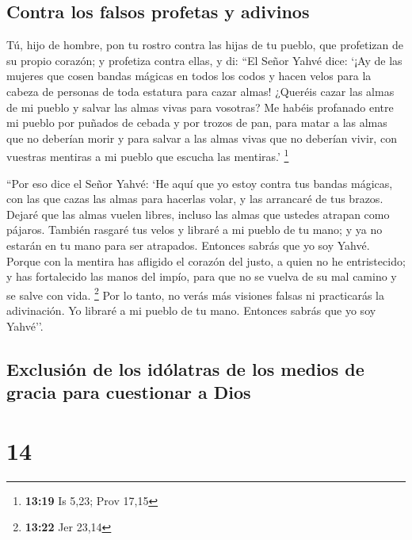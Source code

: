 \hypertarget{contra-los-falsos-profetas-y-adivinos}{%
\subsection{Contra los falsos profetas y
adivinos}\label{contra-los-falsos-profetas-y-adivinos}}

 Tú, hijo de hombre, pon tu rostro contra las hijas de tu
pueblo, que profetizan de su propio corazón; y profetiza contra ellas,
 y di: ``El Señor Yahvé dice: `¡Ay de las mujeres que
cosen bandas mágicas en todos los codos y hacen velos para la cabeza de
personas de toda estatura para cazar almas! ¿Queréis cazar las almas de
mi pueblo y salvar las almas vivas para vosotras?  Me
habéis profanado entre mi pueblo por puñados de cebada y por trozos de
pan, para matar a las almas que no deberían morir y para salvar a las
almas vivas que no deberían vivir, con vuestras mentiras a mi pueblo que
escucha las mentiras.' \footnote{\textbf{13:19} Is 5,23; Prov 17,15}

 ``Por eso dice el Señor Yahvé: `He aquí que yo estoy
contra tus bandas mágicas, con las que cazas las almas para hacerlas
volar, y las arrancaré de tus brazos. Dejaré que las almas vuelen
libres, incluso las almas que ustedes atrapan como pájaros.
 También rasgaré tus velos y libraré a mi pueblo de tu
mano; y ya no estarán en tu mano para ser atrapados. Entonces sabrás que
yo soy Yahvé.  Porque con la mentira has afligido el
corazón del justo, a quien no he entristecido; y has fortalecido las
manos del impío, para que no se vuelva de su mal camino y se salve con
vida. \footnote{\textbf{13:22} Jer 23,14}  Por lo tanto,
no verás más visiones falsas ni practicarás la adivinación. Yo libraré a
mi pueblo de tu mano. Entonces sabrás que yo soy Yahvé''.

\hypertarget{exclusiuxf3n-de-los-iduxf3latras-de-los-medios-de-gracia-para-cuestionar-a-dios}{%
\subsection{Exclusión de los idólatras de los medios de gracia para
cuestionar a
Dios}\label{exclusiuxf3n-de-los-iduxf3latras-de-los-medios-de-gracia-para-cuestionar-a-dios}}

\hypertarget{section-13}{%
\section{14}\label{section-13}}

